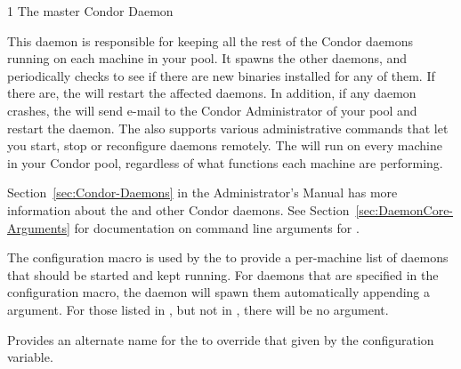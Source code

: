 \begin{ManPage}{\label{man-condor-master}}{1}
{The master Condor Daemon}

\Synopsis {}

\Description 

This daemon is responsible for keeping all the
rest of the Condor daemons running on each machine in your pool.  It  
spawns the other daemons, and periodically checks to see if there are
new binaries installed for any of them.  If there are,
the  will restart the affected daemons.
In addition, if any daemon crashes, the
 will send e-mail to the Condor Administrator of your pool and 
restart the daemon.  The  also supports various
administrative commands that let you start, stop or reconfigure
daemons remotely.  The  will run on every machine in 
your Condor pool, regardless of what functions each machine are
performing.

Section~\ref{sec:Condor-Daemons} in the Administrator's Manual
has more information
about the  and other Condor daemons.
See Section~\ref{sec:DaemonCore-Arguments}
for documentation on
command line arguments for .

The  configuration macro is used by the
 to provide a per-machine list of daemons that
should be started and kept running.
For daemons that are specified in the 
configuration macro,
the  daemon will spawn them automatically
appending a  argument.
For those listed in , but not in ,
there will be no  argument.

\begin{Options}
            {Provides an alternate name for the 
            to override that given by the 
	    configuration variable.
            }
\end{Options}

\end{ManPage}
